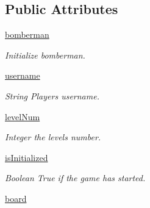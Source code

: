 \subsection*{Public Attributes}
\begin{DoxyCompactItemize}
\item 
\hypertarget{classsrc_1_1level_1_1_level_a07cb236f1acaa42ea5ad2c20fec75c3b}{}\hyperlink{classsrc_1_1level_1_1_level_a07cb236f1acaa42ea5ad2c20fec75c3b}{bomberman}\label{classsrc_1_1level_1_1_level_a07cb236f1acaa42ea5ad2c20fec75c3b}

\begin{DoxyCompactList}\small\item\em Initialize bomberman. \end{DoxyCompactList}\item 
\hypertarget{classsrc_1_1level_1_1_level_a7ec8be181d4558bc3f7b8c106a6aeb5a}{}\hyperlink{classsrc_1_1level_1_1_level_a7ec8be181d4558bc3f7b8c106a6aeb5a}{username}\label{classsrc_1_1level_1_1_level_a7ec8be181d4558bc3f7b8c106a6aeb5a}

\begin{DoxyCompactList}\small\item\em String Player\textquotesingle{}s username. \end{DoxyCompactList}\item 
\hypertarget{classsrc_1_1level_1_1_level_a8b26c1249a2d161c058595e789948bf9}{}\hyperlink{classsrc_1_1level_1_1_level_a8b26c1249a2d161c058595e789948bf9}{level\+Num}\label{classsrc_1_1level_1_1_level_a8b26c1249a2d161c058595e789948bf9}

\begin{DoxyCompactList}\small\item\em Integer the level\textquotesingle{}s number. \end{DoxyCompactList}\item 
\hypertarget{classsrc_1_1level_1_1_level_a65841b782b1342d40aa32c3a788cf6b0}{}\hyperlink{classsrc_1_1level_1_1_level_a65841b782b1342d40aa32c3a788cf6b0}{is\+Initialized}\label{classsrc_1_1level_1_1_level_a65841b782b1342d40aa32c3a788cf6b0}

\begin{DoxyCompactList}\small\item\em Boolean True if the game has started. \end{DoxyCompactList}\item 
\hypertarget{classsrc_1_1level_1_1_level_aa09aade96eec6dbcdf4b04754a3fcf17}{}\hyperlink{classsrc_1_1level_1_1_level_aa09aade96eec6dbcdf4b04754a3fcf17}{board}\label{classsrc_1_1level_1_1_level_aa09aade96eec6dbcdf4b04754a3fcf17}


\end{DoxyCompactItemize}
